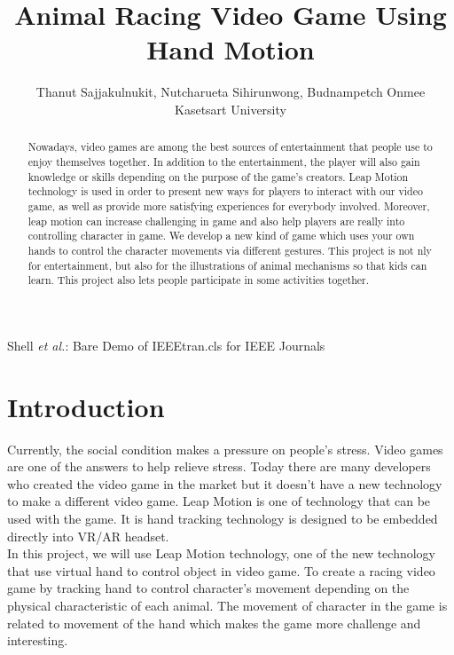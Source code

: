 \documentclass[journal]{IEEEtran}										    %
\title{\textbf{Animal Racing Video Game Using Hand Motion}}
\author{Thanut Sajjakulnukit, Nutcharueta Sihirunwong, Budnampetch Onmee \\
    \Large Kasetsart University }
\begin{document}
    {Shell \MakeLowercase{\textit{et al.}}: Bare Demo of IEEEtran.cls for IEEE Journals}
    \maketitle
    
    \begin{abstract}                                                        %
        Nowadays, video games are among the best sources of 
        entertainment that people use to enjoy themselves together.
        In addition to the entertainment, the player will also gain 
        knowledge or skills depending on the purpose of the game’s 
        creators. Leap Motion technology is used in order to 
        present new ways for players to interact with our video 
        game, as well as provide more satisfying experiences for 
        everybody involved. Moreover, leap motion can increase 
        challenging in game and also help players are really into 
        controlling character in game. We  develop a new kind of 
        game which uses your own hands to control the character 
        movements via different gestures. This project is not 
        nly for entertainment, but also for the illustrations 
        of animal mechanisms so that kids can learn. This 
        project also lets people participate in some 
        activities together.

    \end{abstract}

    \section{Introduction}                                                  %
    Currently, the social condition makes a pressure on people’s 
    stress. Video games are one of the answers to help relieve 
    stress. Today there are many developers who created the video 
    game in the market but it doesn't have a new technology to make 
    a different video game. Leap Motion is one of technology that 
    can be used with the game. It is hand tracking technology is 
    designed to be embedded directly into VR/AR headset. \\

    In this project, we will use Leap Motion technology, one of
    the new technology that use virtual hand to control object
    in video game. To create a racing video game by tracking 
    hand to control character’s movement depending on the 
    physical characteristic of each animal. The movement of 
    character in the game is related to movement of the hand 
    which makes the game more challenge and interesting.
    
\end{document}
